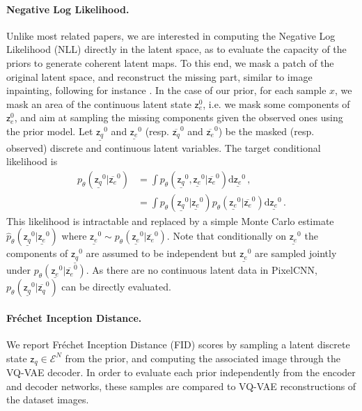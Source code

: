 \documentclass{article}
\theoremstyle{plain}
\theoremstyle{definition}
\theoremstyle{remark}
\newcommand{\latentcont}{\mathsf{z}_e}
\newcommand{\latentdis}{\mathsf{z}_q}
\newcommand{\embedspace}{\mathcal{E}}
\begin{document}
\paragraph{Negative Log Likelihood. }\label{nll_paragraph}
Unlike most related papers, we are interested in computing the Negative Log Likelihood (NLL) directly in the latent space, as to evaluate the capacity of the priors to generate coherent latent maps.
To this end, we mask a patch of the original latent space, and reconstruct the missing part, similar to image inpainting, following for instance \cite{van2016pixel}.
 In the case of our prior, for each sample $x$, we mask an area of the continuous latent state $\latentcont^0$, i.e. we mask some components of $\latentcont^0$, and aim at sampling the missing components given the observed ones using the prior model. Let $\underline{\latentdis}^0$ and $\underline{\latentcont}^0$ (resp. $\overline{\latentdis}^0$ and $\overline{\latentcont}^0$) be the masked (resp. observed) discrete and continuous latent variables. The target conditional likelihood is
\begin{align*}
p_{\theta}(\underline{\latentdis}^0|\overline{\latentcont}^0) &= \int p_{\theta}(\underline{\latentdis}^0,\underline{\latentcont}^0|\overline{\latentcont}^0)\mathrm{d} \underline{\latentcont}^0\,,\\
&= \int p_{\theta}(\underline{\latentdis}^0|\underline{\latentcont}^0)p_{\theta}(\underline{\latentcont}^0|\overline{\latentcont}^0)\mathrm{d} \underline{\latentcont}^0\,.
\end{align*}
This likelihood is intractable and replaced by a simple Monte Carlo estimate $\hat{p}_{\theta}(\underline{\latentdis}^0|\underline{\latentcont}^0)$ where $\underline{\latentcont}^0\sim p_{\theta}(\underline{\latentcont}^0|\overline{\latentcont}^0)$. Note that conditionally on $\underline{\latentcont}^0$ the components of $\underline{\latentdis}^0$ are assumed to be independent but $\underline{\latentcont}^0$ are sampled jointly under $p_{\theta}(\underline{\latentcont}^0|\overline{\latentcont}^0)$. As there are no continuous latent data in PixelCNN, $p_{\theta}(\underline{\latentdis}^0|\overline{\latentdis}^0)$ can be directly evaluated.

\paragraph{Fr\'echet Inception Distance. }
We report Fr\'echet Inception Distance (FID) scores by sampling a latent discrete state $\latentdis \in \embedspace^N$ from the prior, and computing the associated image through the VQ-VAE decoder. In order to evaluate each prior independently from the encoder and decoder networks, these samples are compared to VQ-VAE reconstructions of the dataset images.
\end{document}
